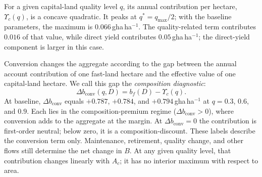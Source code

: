\documentclass[preprint,12pt,authoryear]{elsarticle}
\newcommand{\dconv}{\Delta b_{\mathrm{conv}}}
\newcommand{\Ups}{\Upsilon_c}
\begin{document}
For a given capital-land quality level $q$, its annual contribution per hectare, $\Ups(q)$, is a concave quadratic. It peaks at $q^*=q_{\max}/2$; with the baseline parameters, the maximum is $0.066$\,gha\,ha$^{-1}$. The quality-related term contributes $0.016$ of that value, while direct yield contributes $0.05$\,gha\,ha$^{-1}$; the direct-yield component is larger in this case.

Conversion changes the aggregate according to the gap between the annual account contribution of one fast-land hectare and the effective value of one capital-land hectare. We call this gap the \emph{composition diagnostic}:
\begin{equation}\label{eq:dconv}
\dconv(q,D)=b_f(D)-\Ups(q).
\end{equation}
At baseline, $\dconv$ equals $+0.787$, $+0.784$, and $+0.794$\,gha\,ha$^{-1}$ at $q=0.3$, $0.6$, and $0.9$. Each lies in the composition-premium regime ($\dconv>0$), where conversion adds to the aggregate at the margin. At $\dconv=0$ the contribution is first-order neutral; below zero, it is a composition-discount. These labels describe the conversion term only. Maintenance, retirement, quality change, and other flows still determine the net change in $B$. At any given quality level, that contribution changes linearly with $A_c$; it has no interior maximum with respect to area.
\end{document}
